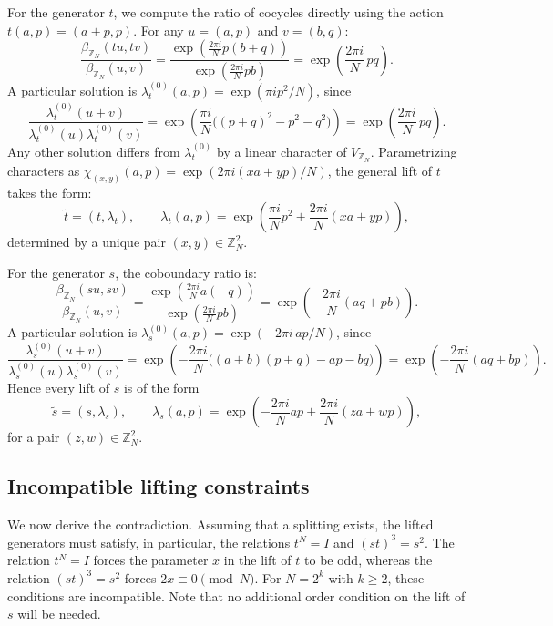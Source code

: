 \documentclass[11pt, reqno]{amsart}
\theoremstyle{definition}
\theoremstyle{remark}
\newcommand{\Z}{\mathbb{Z}}
\begin{document}
For the generator $t$, we compute the ratio of cocycles directly using the action $t(a, p) = (a+p, p)$. For any $u=(a,p)$ and $v=(b,q)$:
\begin{equation}
\frac{\beta_{\Z_N}(tu, tv)}{\beta_{\Z_N}(u, v)} = \frac{\exp(\frac{2\pi i}{N} p(b+q))}{\exp(\frac{2\pi i}{N} pb)} = \exp\!\left(\frac{2\pi i}{N}\, pq\right).
\end{equation}
A particular solution is $\lambda_t^{(0)}(a, p) = \exp(\pi i p^2/N)$, since
\begin{equation}
\frac{\lambda_t^{(0)}(u + v)}{\lambda_t^{(0)}(u)\lambda_t^{(0)}(v)} = \exp\!\left(\frac{\pi i}{N}\bigl((p + q)^2 - p^2 - q^2\bigr)\right) = \exp\!\left(\frac{2\pi i}{N}\, pq\right).
\end{equation}
Any other solution differs from $\lambda_t^{(0)}$ by a linear character of $V_{\Z_N}$. Parametrizing characters as $\chi_{(x,y)}(a, p) = \exp(2\pi i(xa + yp)/N)$, the general lift of $t$ takes the form:
\begin{equation}\label{eq:lift-t}
\tilde{t} = (t, \lambda_t), \qquad \lambda_t(a, p) = \exp\!\left(\frac{\pi i}{N} p^2 + \frac{2\pi i}{N}(xa + yp)\right),
\end{equation}
determined by a unique pair $(x, y) \in \Z_N^2$.

For the generator $s$, the coboundary ratio is:
\begin{equation}
\frac{\beta_{\Z_N}(su, sv)}{\beta_{\Z_N}(u, v)} = \frac{\exp(\frac{2\pi i}{N} a(-q))}{\exp(\frac{2\pi i}{N} pb)} = \exp\!\left(-\frac{2\pi i}{N} (aq + pb)\right).
\end{equation}
A particular solution is $\lambda_s^{(0)}(a, p) = \exp(-2\pi i\, ap/N)$, since
\[
\frac{\lambda_s^{(0)}(u+v)}{\lambda_s^{(0)}(u)\lambda_s^{(0)}(v)} = \exp\!\left(-\frac{2\pi i}{N}\bigl((a+b)(p+q) - ap - bq\bigr)\right) = \exp\!\left(-\frac{2\pi i}{N}(aq+bp)\right).
\]
Hence every lift of $s$ is of the form
\begin{equation}\label{eq:lift-s}
\tilde{s} = (s, \lambda_s), \qquad \lambda_s(a, p) = \exp\!\left(-\frac{2\pi i}{N} ap + \frac{2\pi i}{N}(za + wp)\right),
\end{equation}
for a pair $(z, w) \in \Z_N^2$.

\subsection{Incompatible lifting constraints}

We now derive the contradiction. Assuming that a splitting exists, the lifted generators must satisfy, in particular, the relations $t^N=I$ and $(st)^3=s^2$. The relation $t^N=I$ forces the parameter $x$ in the lift of $t$ to be odd, whereas the relation $(st)^3=s^2$ forces $2x\equiv 0\pmod N$. For $N=2^k$ with $k\geq 2$, these conditions are incompatible. Note that no additional order condition on the lift of $s$ will be needed.
\end{document}
